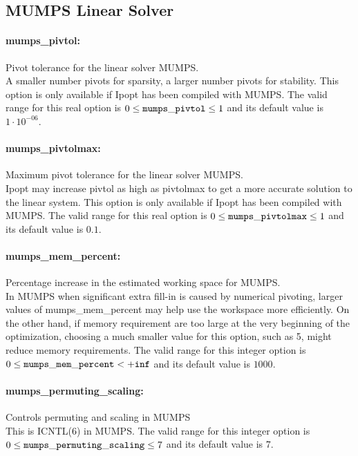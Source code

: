 \subsection{MUMPS Linear Solver}

\paragraph{mumps\_pivtol:}\label{opt:mumps_pivtol} Pivot tolerance for the linear solver MUMPS. \\
 A smaller number pivots for sparsity, a larger
number pivots for stability.  This option is only
available if Ipopt has been compiled with MUMPS. The valid range for this real option is 
$0 \le {\tt mumps\_pivtol } \le 1$
and its default value is $1 \cdot 10^{-06}$.


\paragraph{mumps\_pivtolmax:}\label{opt:mumps_pivtolmax} Maximum pivot tolerance for the linear solver MUMPS. \\
 Ipopt may increase pivtol as high as pivtolmax to
get a more accurate solution to the linear
system.  This option is only available if Ipopt
has been compiled with MUMPS. The valid range for this real option is 
$0 \le {\tt mumps\_pivtolmax } \le 1$
and its default value is $0.1$.


\paragraph{mumps\_mem\_percent:}\label{opt:mumps_mem_percent} Percentage increase in the estimated working space for MUMPS. \\
 In MUMPS when significant extra fill-in is caused
by numerical pivoting, larger values of
mumps\_mem\_percent may help use the workspace
more efficiently.  On the other hand, if memory
requirement are too large at the very beginning
of the optimization, choosing a much smaller
value for this option, such as 5, might reduce
memory requirements. The valid range for this integer option is
$0 \le {\tt mumps\_mem\_percent } <  {\tt +inf}$
and its default value is $1000$.


\paragraph{mumps\_permuting\_scaling:}\label{opt:mumps_permuting_scaling} Controls permuting and scaling in MUMPS \\
 This is ICNTL(6) in MUMPS. The valid range for this integer option is
$0 \le {\tt mumps\_permuting\_scaling } \le 7$
and its default value is $7$.



